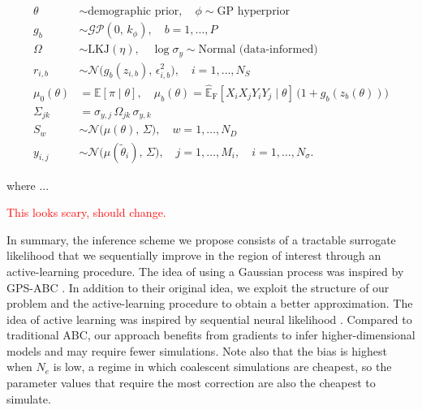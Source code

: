 \documentclass[12pt]{article}
\begin{document}
\begin{equation}
	\begin{aligned}
		\theta        & \sim \text{demographic prior}, \quad \phi \sim \text{GP hyperprior}                         \\
		g_b           & \sim \mathcal{GP}(0,\, k_\phi),  \quad b = 1, \dots, P                                      \\
		\Omega        & \sim \mathrm{LKJ}(\eta), \quad \log\sigma_y \sim \text{Normal (data-informed)}              \\
		r_{i,b}       & \sim \mathcal{N}\big(g_b(z_{i,b}),\, \epsilon_{i,b}^2\big),
		\quad i = 1, \dots, N_S                                                                                     \\
		\mu_0(\theta) & = \mathbb{E}[\pi \mid \theta], \quad
		\mu_b(\theta) = \widehat{\mathbb{E}}_{\mathrm{F}}[X_iX_jY_iY_j \mid \theta]\,\big(1 + g_b(z_b(\theta))\big) \\
		\Sigma_{jk}   & = \sigma_{y,j}\,\Omega_{jk}\,\sigma_{y,k}                                                   \\
		S_w           & \sim \mathcal{N}\big(\mu(\theta),\, \Sigma\big), \quad w = 1, \dots, N_D                    \\
		y_{i,j}       & \sim \mathcal{N}\big(\mu(\tilde\theta_i),\, \Sigma\big),
		\quad j = 1, \dots, M_i, \quad i = 1, \dots, N_\sigma.
	\end{aligned}
	\label{eq:joint_model}
\end{equation}

where ...

\textcolor{red}{This looks scary, should change.  }

In summary, the inference scheme we propose consists of a tractable surrogate likelihood that we sequentially improve in the region of interest through an active-learning procedure. The idea of using a Gaussian process was inspired by GPS-ABC \citep{gps_abc}. In addition to their original idea, we exploit the structure of our problem and the active-learning procedure to obtain a better approximation. The idea of active learning was inspired by sequential neural likelihood \citep{pmlr-v89-papamakarios19a}. Compared to traditional ABC, our approach benefits from gradients to infer higher-dimensional models and may require fewer simulations. Note also that the bias is highest when $N_e$ is low, a regime in which coalescent simulations are cheapest, so the parameter values that require the most correction are also the cheapest to simulate.
\end{document}
